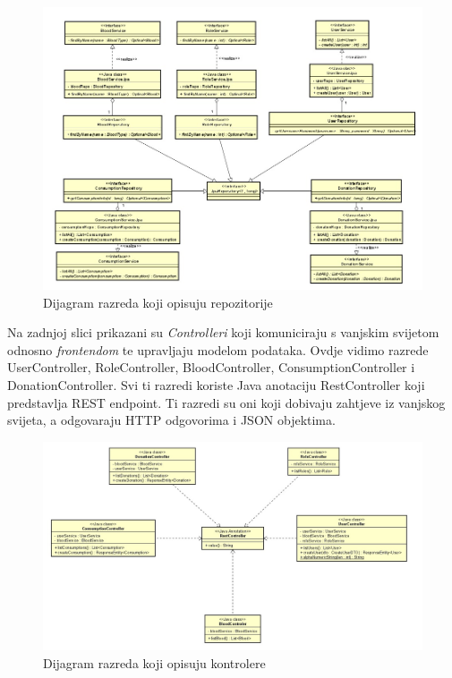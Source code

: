 \begin{figure}[H]
	\centering
	\includegraphics[width=\textwidth, scale=2.0]{dijagrami/dijagram_razreda2}
	\caption{Dijagram razreda koji opisuju repozitorije}
	\label{fig:dijagram_repozitorija}
\end{figure}

\eject

	Na zadnjoj slici prikazani su \textit{Controlleri} koji komuniciraju s vanjskim svijetom odnosno \textit{frontendom} te upravljaju modelom podataka. Ovdje vidimo razrede UserController, RoleController, BloodController, ConsumptionController i DonationController. Svi ti razredi koriste Java anotaciju RestController koji predstavlja REST endpoint. Ti razredi su oni koji dobivaju zahtjeve iz vanjskog svijeta, a odgovaraju HTTP odgovorima i JSON objektima.
	
\begin{figure}[H]
	\centering
	\includegraphics[width=\textwidth, scale=0.5]{dijagrami/dijagram_razreda3}
	\caption{Dijagram razreda koji opisuju kontrolere}
	\label{fig:dijagram_kontrolera}
\end{figure}

